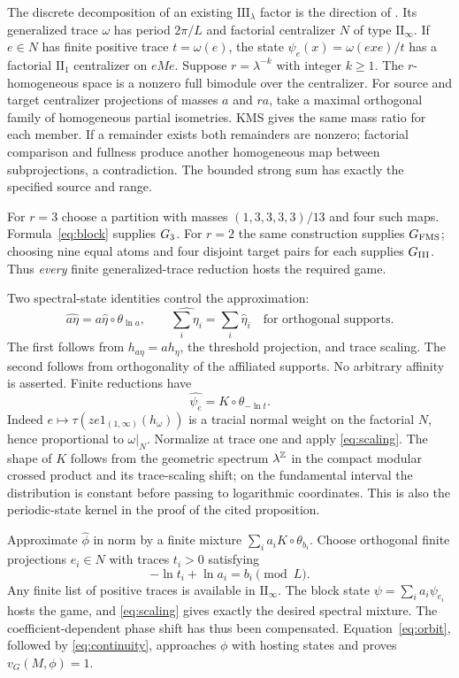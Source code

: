 The discrete decomposition of an existing $\mathrm{III}_\lambda$ factor is the direction of \cite[Theorem 4.4.1(b)]{Connes}. Its generalized trace $\omega$ has period $2\pi/L$ and factorial centralizer $N$ of type $\mathrm{II}_\infty$. If $e\in N$ has finite positive trace $t=\omega(e)$, the state $\psi_e(x)=\omega(exe)/t$ has a factorial $\mathrm{II}_1$ centralizer on $eMe$. Suppose $r=\lambda^{-k}$ with integer $k\ge1$. The $r$-homogeneous space is a nonzero full bimodule over the centralizer. For source and target centralizer projections of masses $a$ and $ra$, take a maximal orthogonal family of homogeneous partial isometries. KMS gives the same mass ratio for each member. If a remainder exists both remainders are nonzero; factorial comparison and fullness produce another homogeneous map between subprojections, a contradiction. The bounded strong sum has exactly the specified source and range.

For $r=3$ choose a partition with masses $(1,3,3,3,3)/13$ and four such maps. Formula~\eqref{eq:block} supplies $G_3$. For $r=2$ the same construction supplies $G_{\mathrm{FMS}}$; choosing nine equal atoms and four disjoint target pairs for each supplies $G_{\mathrm{III}}$. Thus \emph{every} finite generalized-trace reduction hosts the required game.

Two spectral-state identities control the approximation:
\begin{equation}\label{eq:scaling}
 \widehat{a\eta}=a\widehat\eta\circ\theta_{\ln a},\qquad
 \widehat{\sum_i\eta_i}=\sum_i\widehat\eta_i\quad\text{for orthogonal supports}.
\end{equation}
The first follows from $h_{a\eta}=ah_\eta$, the threshold projection, and trace scaling. The second follows from orthogonality of the affiliated supports. No arbitrary affinity is asserted. Finite reductions have
\[
 \widehat{\psi_e}=K\circ\theta_{-\ln t}.
\]
Indeed $e\mapsto\tau(ze1_{(1,\infty)}(h_\omega))$ is a tracial normal weight on the factorial $N$, hence proportional to $\omega|_N$. Normalize at trace one and apply \eqref{eq:scaling}. The shape of $K$ follows from the geometric spectrum $\lambda^\mathbb Z$ in the compact modular crossed product and its trace-scaling shift; on the fundamental interval the distribution is constant before passing to logarithmic coordinates. This is also the periodic-state kernel in the proof of the cited proposition.

Approximate $\widehat\phi$ in norm by a finite mixture $\sum_i a_iK\circ\theta_{b_i}$. Choose orthogonal finite projections $e_i\in N$ with traces $t_i>0$ satisfying
\[
 -\ln t_i+\ln a_i=b_i\pmod L.
\]
Any finite list of positive traces is available in $\mathrm{II}_\infty$. The block state $\psi=\sum_i a_i\psi_{e_i}$ hosts the game, and \eqref{eq:scaling} gives exactly the desired spectral mixture. The coefficient-dependent phase shift has thus been compensated. Equation~\eqref{eq:orbit}, followed by \eqref{eq:continuity}, approaches $\phi$ with hosting states and proves $v_G(M,\phi)=1$.

